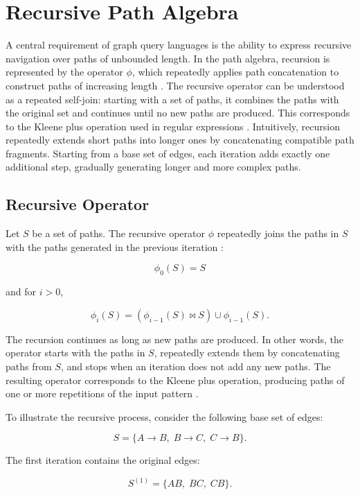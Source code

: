 \section{Recursive Path Algebra}

A central requirement of graph query languages is the ability to express recursive navigation over paths of unbounded length. In the path algebra, recursion is represented by the operator $\phi$, which repeatedly applies path concatenation to construct paths of increasing length \cite{angles2024path}.
The recursive operator can be understood as a repeated self-join: starting with a set of paths, it combines the paths with the original set and continues until no new paths are produced. This corresponds to the Kleene plus operation used in regular expressions \cite{angles2024path}.
Intuitively, recursion repeatedly extends short paths into longer ones by concatenating compatible path fragments. Starting from a base set of edges, each iteration adds exactly one additional step, gradually generating longer and more complex paths.


\subsection{Recursive Operator}

Let $S$ be a set of paths. The recursive operator $\phi$ repeatedly joins the paths in $S$ with the paths generated in the previous iteration \cite{angles2024path}:

\[
\phi_0(S) = S
\]

and for $i > 0$,

\[
\phi_i(S)
=
\left(\phi_{i-1}(S) \bowtie S\right)
\cup
\phi_{i-1}(S).
\]

The recursion continues as long as new paths are produced. In other words, the operator starts with the paths in $S$, repeatedly extends them by concatenating paths from $S$, and stops when an iteration does not add any new paths. The resulting operator corresponds to the Kleene plus operation, producing paths of one or more repetitions of the input pattern \cite{angles2024path}.

To illustrate the recursive process, consider the following base set of edges:

\[
S = \{ A \rightarrow B,\; B \rightarrow C,\; C \rightarrow B \}.
\]

The first iteration contains the original edges:

\[
S^{(1)} = \{ AB,\; BC,\; CB \}.
\]

